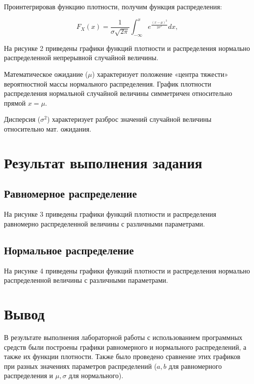 Проинтегрировав функцию плотности, получим функция распределения:

$$
F_{X} (x) = \frac{1}{\sigma\sqrt{2\pi}} \int_{-\infty}^{x}{e^{\frac{(x - \mu)^2}{2\sigma^2}}dx},
$$

На рисунке 2 приведены графики функций плотности и распределения нормально распределенной непрерывной случайной величины.




Математическое ожидание ($\mu$) характеризует положение «центра
тяжести» вероятностной массы нормального распределения. График плотности распределения нормальной случайной величины симметричен относительно прямой $x = \mu$.

Дисперсия ($\sigma^2$) характеризует разброс значений случайной величины
относительно мат. ожидания.



\section*{Результат выполнения задания}

\subsection*{Равномерное распределение}
На рисунке 3 приведены графики функций плотности и распределения равномерно распределенной величины с различными параметрами.


\subsection*{Нормальное распределение}
На рисунке 4 приведены графики функций плотности и распределения нормально распределенной величины с различными параметрами.





\section*{Вывод}

В результате выполнения лабораторной работы с использованием программных средств были построены графики равномерного и нормального распределений, а также их функции плотности. Также было проведено сравнение этих графиков при разных значениях параметров распределений ($a, b$ для равномерного распределения и $\mu, \sigma$ для нормального).


